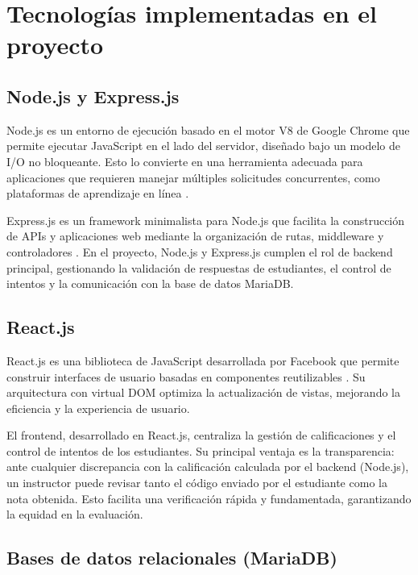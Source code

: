 \documentclass[letter,oneside,12pt,spanish]{report}
\begin{document}
\section{Tecnologías implementadas en el proyecto}

\subsection{Node.js y Express.js}

Node.js es un entorno de ejecución basado en el motor V8 de Google Chrome que permite ejecutar JavaScript en el lado del servidor, diseñado bajo un modelo de I/O no bloqueante. Esto lo convierte en una herramienta adecuada para aplicaciones que requieren manejar múltiples solicitudes concurrentes, como plataformas de aprendizaje en línea \parencite{tilkov2010}.

Express.js es un framework minimalista para Node.js que facilita la construcción de APIs y aplicaciones web mediante la organización de rutas, middleware y controladores \parencite{brown2019}. En el proyecto, Node.js y Express.js cumplen el rol de backend principal, gestionando la validación de respuestas de estudiantes, el control de intentos y la comunicación con la base de datos MariaDB.

\subsection{React.js}

React.js es una biblioteca de JavaScript desarrollada por Facebook que permite construir interfaces de usuario basadas en componentes reutilizables \parencite{banks2017}. Su arquitectura con virtual DOM optimiza la actualización de vistas, mejorando la eficiencia y la experiencia de usuario.

El frontend, desarrollado en React.js, centraliza la gestión de calificaciones y el control de intentos de los estudiantes. Su principal ventaja es la transparencia: ante cualquier discrepancia con la calificación calculada por el backend (Node.js), un instructor puede revisar tanto el código enviado por el estudiante como la nota obtenida. Esto facilita una verificación rápida y fundamentada, garantizando la equidad en la evaluación.

\subsection{Bases de datos relacionales (MariaDB)}
\end{document}
